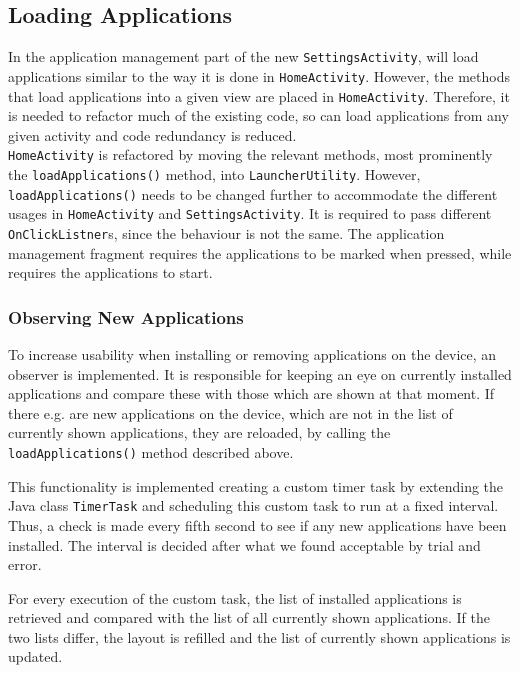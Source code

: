 \subsection{Loading Applications}\label{sect:sprint3:refactoring}
In the application management part of the new \lstinline!SettingsActivity!, \launcher will load applications similar to the way it is done in \lstinline|HomeActivity|.
However, the methods that load applications into a given view are placed in \lstinline!HomeActivity!.
Therefore, it is needed to refactor much of the existing code, so \launcher can load applications from any given activity and code redundancy is reduced.\\

\lstinline!HomeActivity! is refactored by moving the relevant methods, most prominently the \lstinline|loadApplications()| method, into \lstinline!LauncherUtility!.
However, \lstinline|loadApplications()| needs to be changed further to accommodate the different usages in \lstinline!HomeActivity! and \lstinline!SettingsActivity!. 
It is required to pass different \lstinline|OnClickListner|s, since the behaviour is not the same.
The application management fragment requires the applications to be marked when pressed, while \homeactivity requires the applications to start.

\subsubsection{Observing New Applications}\label{sec:sprint3:observing}
To increase usability when installing or removing applications on the device, an observer is implemented.
It is responsible for keeping an eye on currently installed applications and compare these with those which are shown at that moment. 
If there e.g. are new applications on the device, which are not in the list of currently shown applications, they are reloaded, by calling the \lstinline|loadApplications()| method described above.

This functionality is implemented creating a custom timer task by extending the Java class \lstinline!TimerTask! and scheduling this custom task to run at a fixed interval. 
Thus, a check is made every fifth second to see if any new applications have been installed.
The interval is decided after what we found acceptable by trial and error.

For every execution of the custom task, the list of installed applications is retrieved and compared with the list of all currently shown applications.
If the two lists differ, the layout is refilled and the list of currently shown applications is updated.